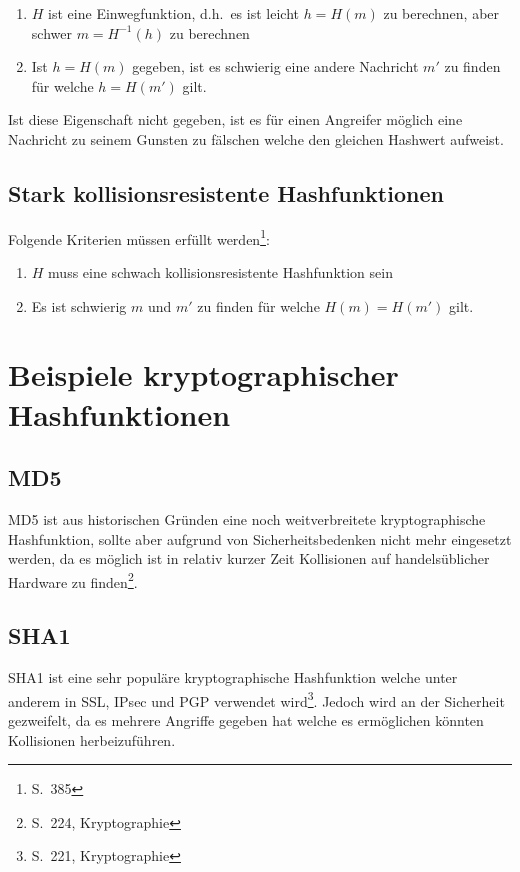 \begin{enumerate}
\item $H$ ist eine Einwegfunktion, d.h.~es ist leicht $h = H(m)$ zu
  berechnen, aber schwer $m = H^{-1}(h)$ zu berechnen
\item Ist $h = H(m)$ gegeben, ist es schwierig eine andere Nachricht
  $m'$ zu finden für welche $h = H(m')$ gilt.
\end{enumerate}

Ist diese Eigenschaft nicht gegeben, ist es für einen Angreifer
möglich eine Nachricht zu seinem Gunsten zu fälschen welche den
gleichen Hashwert aufweist.

\subsection{Stark kollisionsresistente Hashfunktionen}

Folgende Kriterien müssen erfüllt werden\footnote{S.~385}:

\begin{enumerate}
\item $H$ muss eine schwach kollisionsresistente Hashfunktion sein
\item Es ist schwierig $m$ und $m'$ zu finden für welche $H(m) =
  H(m')$ gilt.
\end{enumerate}

\section{Beispiele kryptographischer Hashfunktionen}

\subsection{\ac{MD5}}

MD5 ist aus historischen Gründen eine noch weitverbreitete
kryptographische Hashfunktion, sollte aber aufgrund von
Sicherheitsbedenken nicht mehr eingesetzt werden, da es möglich ist in
relativ kurzer Zeit Kollisionen auf handelsüblicher Hardware zu
finden\footnote{S.~224, Kryptographie}.

\subsection{\ac{SHA1}}

SHA1 ist eine sehr populäre kryptographische Hashfunktion welche unter
anderem in SSL, IPsec und PGP verwendet wird\footnote{S.~221,
  Kryptographie}.  Jedoch wird an der Sicherheit gezweifelt, da es
mehrere Angriffe gegeben hat welche es ermöglichen könnten Kollisionen
herbeizuführen.

